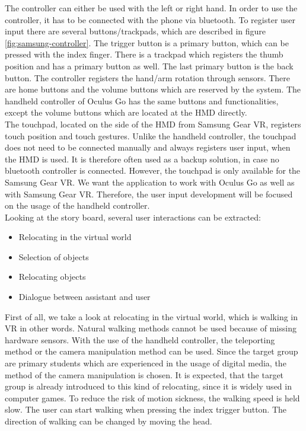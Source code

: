 The controller can either be used with the left or right hand. In order to use the controller, it has to be connected with the phone via bluetooth. To register user input there are several buttons/trackpads, which are described in figure \ref{fig:samsung-controller}. The trigger button is a primary button, which can be pressed with the index finger. There is a trackpad which registers the thumb position and has a primary button as well. The last primary button is the back button. The controller registers the hand/arm rotation through sensors. There are home buttons and the volume buttons which are reserved by the system. The handheld controller of Oculus Go has the same buttons and functionalities, except the volume buttons which are located at the HMD directly.\\
The touchpad, located on the side of the HMD from Samsung Gear VR, registers touch position and touch gestures. Unlike the handheld controller, the touchpad does not need to be connected manually and always registers user input, when the HMD is used. It is therefore often used as a backup solution, in case no bluetooth controller is connected. However, the touchpad is only available for the Samsung Gear VR. We want the application to work with Oculus Go as well as with Samsung Gear VR. Therefore, the user input development will be focused on the usage of the handheld controller.\\
Looking at the story board, several user interactions can be extracted:
\begin{itemize}
\item Relocating in the virtual world
\item Selection of objects
\item Relocating objects
\item Dialogue between assistant and user
\end{itemize}
First of all, we take a look at relocating in the virtual world, which is walking in VR in other words. Natural walking methods cannot be used because of missing hardware sensors. With the use of the handheld controller, the teleporting method or the camera manipulation method can be used. Since the target group are primary students which are experienced in the usage of digital media, the method of the camera manipulation is chosen. It is expected, that the target group is already introduced to this kind of relocating, since it is widely used in computer games. To reduce the risk of motion sickness, the walking speed is held slow. The user can start walking when pressing the index trigger button. The direction of walking can be changed by moving the head.\\
